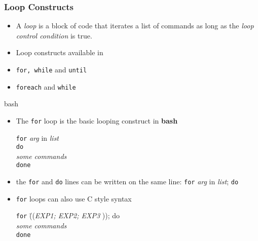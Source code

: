\documentclass[slidestop,mathserif,compress,xcolor=svgnames]{beamer}
\newenvironment{eblock}[0]
{
\begin{beamerboxesrounded}[upper=uppercol2,lower=lowercol2,shadow=true]}
{\end{beamerboxesrounded}}
\begin{document}
\begin{frame}
  \frametitle{\small Loop Constructs}
  \begin{itemize}
    \item A \textit{loop} is a block of code that iterates a list of commands as long as the \textit{loop control condition} is true.
    \item Loop constructs available in 
    \item[\textbf{bash}:] \texttt{for, while} and \texttt{until}
    \item[\textbf{tcsh}:] \texttt{foreach} and \texttt{while}
  \end{itemize}
  \framebreak
  \begin{eblock}{bash}
    \begin{itemize}
      \item The \texttt{for} loop is the basic looping construct in \textbf{bash}
        \begin{tabbing}
          \texttt{for} \=\textit{arg} in \textit{list}\\
          \texttt{do}\\
          \>\textit{some commands}\\
          \texttt{done}
        \end{tabbing}
      \item the \texttt{for} and \texttt{do} lines can be written on the same line: \texttt{for} \textit{arg} in \textit{list}; \texttt{do}
      \item \texttt{for} loops can also use C style syntax
      \begin{tabbing}
        \texttt{for} \=((\textit{EXP1; EXP2; EXP3} )); do\\
        \>\textit{some commands}\\
        \texttt{done}
      \end{tabbing}
    \end{itemize}
  \end{eblock}
  \begin{columns}
    \begin{eblock}{}
      \fontsize{7}{6}
    \end{eblock}
    \begin{eblock}{}
      \fontsize{7}{6}
    \end{eblock}
    \begin{eblock}{}
      \fontsize{7}{6}
    \end{eblock}
  \end{columns}


\end{frame}
\end{document}
